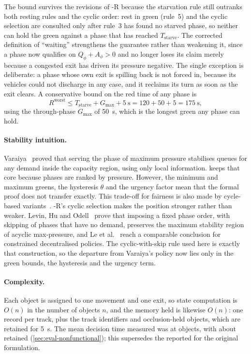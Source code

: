 The bound survives the revisions of \prism{}-R because the starvation rule still outranks both resting rules
and the cyclic order: rest in green (rule~5) and the cyclic selection are consulted only after rule~3 has
found no starved phase, so neither can hold the green against a phase that has reached $T_{\text{starve}}$.
The corrected definition of ``waiting'' strengthens the guarantee rather than weakening it, since a phase now
qualifies on $Q_\phi + A_\phi > 0$ and no longer loses its claim merely because a congested exit has driven
its pressure negative. The single exception is deliberate: a phase whose own exit is spilling back is not
forced in, because its vehicles could not discharge in any case, and it reclaims its turn as soon as the exit
clears. A conservative bound on the red time of any phase is
\begin{equation}
  R^{\text{worst}} \leq T_{\text{starve}} + G_{\max} + 5~\text{s} = 120 + 50 + 5 = 175~\text{s},
  \label{eq:impl-fairness}
\end{equation}
using the through-phase $G_{\max}$ of 50~s, which is the longest green any phase can hold. 

\paragraph{Stability intuition.} Varaiya~\cite{varaiya2013maxpressure} proved that serving the phase
of maximum pressure stabilises queues for any demand inside the capacity region, using only local
information. \prism{} keeps that core because phases are ranked by pressure. However, the minimum and
maximum greens, the hysteresis $\theta$ and the urgency factor mean that the formal proof does not
transfer exactly.  This trade-off for fairness is also made by cycle-based variants~\cite{kouvelas2014maxpressure}.
\prism{}-R's cyclic selection makes the position stronger rather than weaker. Levin, Hu and
Odell~\cite{levin2020cyclic} prove that imposing a fixed phase order, with skipping of phases that have no
demand, preserves the maximum stability region of acyclic max-pressure, and Le et
al.~\cite{le2015decentralized} reach a comparable conclusion for constrained decentralised policies. The
cyclic-with-skip rule used here is exactly that construction, so the departure from Varaiya's policy now lies
only in the green bounds, the hysteresis and the urgency term.

\paragraph{Complexity.} Each object is assigned to one movement and one exit, so state computation is
$O(n)$ in the number of objects $n$, and the memory held is likewise $O(n)$: one record per track, plus the
track identifiers and occlusion-held objects, which are retained for 5~s. The mean decision time measured was
 at  objects, with about  retained
(\cref{sec:eval-nonfunctional}); this supersedes the  reported for the original formulation.

